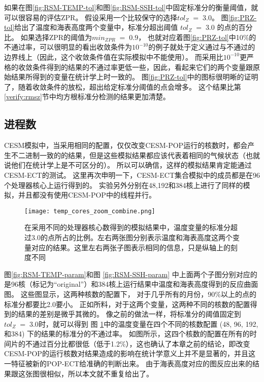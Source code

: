 如果在图\ref{fig:RSM-TEMP-tol}和图\ref{fig:RSM-SSH-tol}中固定标准分的衡量阈值，就可以很容易的评估ZPR。 
假设采用一个比较保守的选择$tol_{Z} \; = \; 3.0$。 
图\ref{fig:PRZ-tol}给出了温度和海表高度两个变量中，标准分超出阈值 $tol_{Z} \; = \; 3.0$ 的点的百分比。 
如果选择ZPR的阈值为$min_{ZPR} \; = \; 0.9$， 也就对应着图\ref{fig:PRZ-tol}中10\%的不通过率，可以很明显的看出收敛条件为$10^{-10}$的例子就处于定义通过与不通过的边界线上（因此，这个收敛条件值在实际模拟中不能使用）。 
而采用比$10^{-10}$更严格的收敛条件得到的结果的不通过率更低一些，因此，看起来它们的两个变量跟原始结果所得到的变量在统计学上时一致的。
图\ref{fig:PRZ-tol}中的图标很明晰的证明了，随着收敛条件的放松，超出给定标准分阈值的点会增多。 
这个结果比第\ref{verify:rmsz}节中均方根标准分检测的结果更加清楚。 



\subsection{进程数}\label{verify:proc}

 
CESM模拟中，当采用相同的配置，仅仅改变CESM-POP运行的核数时，都会产生不二进制一致的的结果，但是这些模拟结果都应该代表着相同的气候状态（也就说他们在统计学上是不可区分的）。
所以可以确信，这样的模拟结果肯定能通过CESM-ECT的测试。 
这里再次申明一下，CESM-ECT集合模拟中的成员都是在96个处理器核心上运行得到的。
实验另外分别在48,192和384核上进行了同样的模拟，并且都没有使用CESM-POP中的线程并行。 


\begin{figure}
\centering
\texttt{[image: temp\_cores\_zoom\_combine.png]}
\caption{
在采用不同的处理器核心数得到的模拟结果中，温度变量的标准分超过3.0的点所占的比例。左右两张图分别表示温度和海表高度这两个变量对应的结果。这里左右两张子图表示相同的信息，只是纵轴上的刻度不同}
\label {fig:combine}
\end{figure}
 
图\ref{fig:RSM-TEMP-param}和图 \ref{fig:RSM-SSH-param} 中上面两个子图分别对应的是96核（标记为“original”）和384核上运行结果中温度和海表高度得到的反应曲面图。 
这些图显示，这两种核数的配置下， 对于几乎所有的月份，90\%以上的点的标准分都要比2.0要小。 
正如所料，对于这两个变量，这两种不同的核数的配置得到的结果的差别是微乎其微的。
像之前的做法一样，将标准分的阈值固定到$tol_{Z} \; = \; 3.0$时，就可以得到 图 \ref{fig:combine}中的温度变量在四个不同的核数配置 (48, 96, 192,和384) 下的结果的标准分的不通过率。
如图所示，这四个核数的配置在所有的时间片的不通过百分比都很低（低于1.2\%），这也确认了本章之前的结论，即改变CESM-POP的运行核数对结果造成的影响在统计学意义上并不是显著的，并且这一特征被新的POP-ECT给准确的判断出来。 
由于海表高度对应的图反应出来的结果跟这张图很相似，所以本文就不重复给出了。

